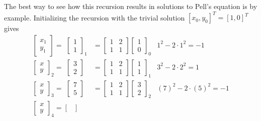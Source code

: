 \documentclass{ximera}
\begin{document}
The best way to see how this recursion results in solutions to Pell's equation is by example. Initializing 
the recursion with the trivial solution $[x_0, y_0]^T =[1,0]^T$ gives
	\begin{align*}
\begin{bmatrix}
x_1 \\ y_1
\end{bmatrix}
 = \,\,
\begin{bmatrix}
1 \\ 1
\end{bmatrix}_1
 &=
\begin{bmatrix}
1 & 2 \\
1 & 1
\end{bmatrix}
\begin{bmatrix}
1\\0 
\end{bmatrix}_0
&  1^2 -2\cdot{1}^2 = -1 
\\
\begin{bmatrix}
x \\ y
\end{bmatrix}_2
=\,\,
\begin{bmatrix}
3\\2
\end{bmatrix}
&=
\begin{bmatrix}
1 & 2 \\
1 & 1
\end{bmatrix}
\begin{bmatrix}
1\\1
\end{bmatrix}_1
&  3^2 -2\cdot{2}^2 = 1 
\\
\begin{bmatrix}
x \\ y
\end{bmatrix}_3
=\,\,
\begin{bmatrix}
7\\5
\end{bmatrix}
&=
\begin{bmatrix}
1 & 2 \\
1 & 1
\end{bmatrix}
\begin{bmatrix}
3\\2
\end{bmatrix}_2
& (7)^2 -2\cdot(5)^2 = -1 
\\
\begin{bmatrix}
x \\ y
\end{bmatrix}_4
=
\begin{bmatrix}

\end{bmatrix}
\end{align*}
\end{document}
